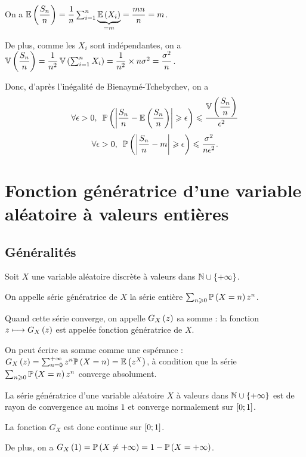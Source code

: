 \begin{dem}~\\
On a \(\operatorname{\mathbb{E}}\left(\dfrac{S_n}{n}\right)=\dfrac{1}{n}\sum_{i=1}^n\underbrace{\operatorname{\mathbb{E}}\left(X_i\right)}_{=m}=\dfrac{mn}{n}=m\).

De plus, comme les \(X_i\) sont indépendantes, on a \(\operatorname{\mathbb{V}}\left(\dfrac{S_n}{n}\right)=\dfrac{1}{n^2}\operatorname{\mathbb{V}}\left(\sum_{i=1}^nX_i\right)=\dfrac{1}{n^2}\times n\sigma^2=\dfrac{\sigma^2}{n}\).

Donc, d'après l'inégalité de Bienaymé-Tchebychev, on a \[\quantifs{\forall\epsilon>0}\proba{\abs{\dfrac{S_n}{n}-\esp{\dfrac{S_n}{n}}}\geq\epsilon}\leq\dfrac{\vari{\dfrac{S_n}{n}}}{\epsilon^2}\] \ie \[\quantifs{\forall\epsilon>0}\proba{\abs{\dfrac{S_n}{n}-m}\geq\epsilon}\leq\dfrac{\sigma^2}{n\epsilon^2}.\]
\end{dem}

\section{Fonction génératrice d'une variable aléatoire à valeurs entières}

\subsection{Généralités}

\begin{defi}
Soit \(X\) une variable aléatoire discrète à valeurs dans \(\mathbb{N}\cup\left\lbrace+\infty\right\rbrace\).

On appelle série génératrice de \(X\) la série entière \(\sum_{n\geqslant0}\mathbb{P}\left(X=n\right)z^n\).

Quand cette série converge, on appelle \(G_X\left(z\right)\) sa somme : la fonction \(z\longmapsto G_X\left(z\right)\) est appelée fonction génératrice de \(X\).
\end{defi}

On peut écrire sa somme comme une espérance : \(G_X\left(z\right)=\sum_{n=0}^{+\infty}z^n\mathbb{P}\left(X=n\right)=\operatorname{\mathbb{E}}\left(z^X\right)\), à condition que la série \(\sum_{n\geqslant0}\mathbb{P}\left(X=n\right)z^n\) converge absolument.

\begin{prop}
La série génératrice d'une variable aléatoire \(X\) à valeurs dans \(\mathbb{N}\cup\left\lbrace+\infty\right\rbrace\) est de rayon de convergence au moins \(1\) et converge normalement sur \(\left[0;1\right]\).

La fonction \(G_X\) est donc continue sur \(\left[0;1\right]\).

De plus, on a \(G_X\left(1\right)=\mathbb{P}\left(X\not=+\infty\right)=1-\mathbb{P}\left(X=+\infty\right)\).
\end{prop}

